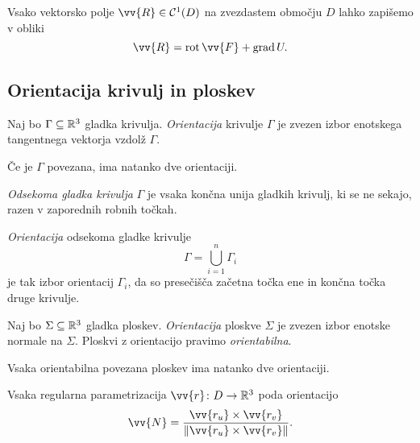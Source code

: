 \begin{opomba}
Vsako vektorsko polje $\vv{R} \in \mathcal{C}^1(D)$ na zvezdastem
območju $D$ lahko zapišemo v obliki
\[
\vv{R} = \rot \vv{F} + \grad U.
\]
\end{opomba}

\newpage

\subsection{Orientacija krivulj in ploskev}

\begin{definicija}
Naj bo $\Gamma \subseteq \mathbb{R}^3$ gladka krivulja.
\emph{Orientacija} krivulje $\Gamma$ je
zvezen izbor enotskega tangentnega vektorja vzdolž $\Gamma$.
\end{definicija}

\begin{opomba}
Če je $\Gamma$ povezana, ima natanko dve orientaciji.
\end{opomba}

\begin{definicija}
\emph{Odsekoma gladka krivulja}
$\Gamma$ je vsaka končna unija gladkih krivulj, ki se ne sekajo,
razen v zaporednih robnih točkah.
\end{definicija}

\begin{definicija}
\emph{Orientacija} odsekoma gladke krivulje
\[
\Gamma = \bigcup_{i=1}^n \Gamma_i
\]
je tak izbor orientacij $\Gamma_i$, da so presečišča začetna točka
ene in končna točka druge krivulje.
\end{definicija}


\begin{definicija}
Naj bo $\Sigma \subseteq \mathbb{R}^3$ gladka ploskev.
\emph{Orientacija} ploskve $\Sigma$ je
zvezen izbor enotske normale na $\Sigma$. Ploskvi z orientacijo
pravimo \emph{orientabilna}.
\end{definicija}

\begin{opomba}
Vsaka orientabilna povezana ploskev ima natanko dve orientaciji.
\end{opomba}

\begin{opomba}
Vsaka regularna parametrizacija $\vv{r} \colon D \to \R^3$ poda
orientacijo
\[
\vv{N} =
\frac{\vv{r_u} \times \vv{r_v}}{\norm{\vv{r_u} \times \vv{r_v}}}.
\]
\end{opomba}

